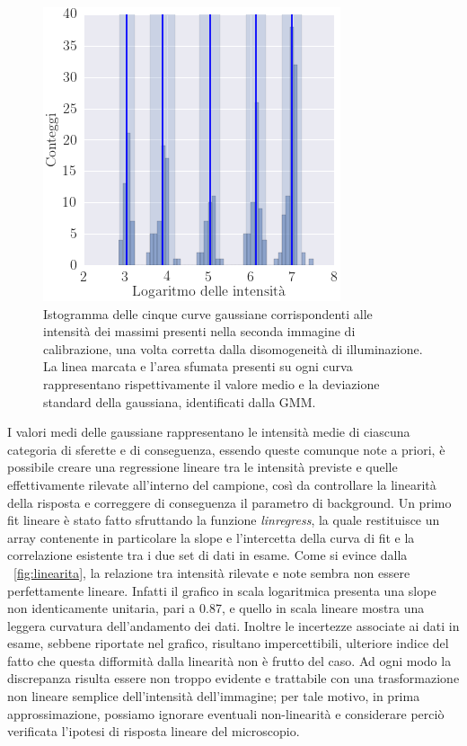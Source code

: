 \begin{figure}
 \centering
 \includegraphics[scale=.60]{img/CAP3istogauss.png}
 \caption{\small{Istogramma delle cinque curve gaussiane corrispondenti alle intensità dei massimi presenti nella seconda immagine di calibrazione, una volta corretta dalla disomogeneità di illuminazione. La linea marcata e l'area sfumata presenti su ogni curva rappresentano rispettivamente il valore medio e la deviazione standard della gaussiana, identificati dalla GMM.}}
 \label{fig:istogauss}
\end{figure}

I valori medi delle gaussiane rappresentano le intensità medie di ciascuna categoria di sferette e di conseguenza, essendo queste comunque note a priori, è possibile creare una regressione lineare tra le intensità previste e quelle effettivamente rilevate all'interno del campione, così da controllare la linearità della risposta e correggere di conseguenza il parametro di background. 
Un primo fit lineare è stato fatto sfruttando la funzione \textit{linregress}, la quale restituisce un array contenente in particolare la slope e l'intercetta della curva di fit e la correlazione esistente tra i due set di dati in esame.
Come si evince dalla \figurename~\ref{fig:linearita}, la relazione tra intensità rilevate e note sembra non essere perfettamente lineare. Infatti il grafico in scala logaritmica presenta una slope non identicamente unitaria, pari a 0.87, e quello in scala lineare mostra una leggera curvatura dell'andamento dei dati. 
Inoltre le incertezze associate ai dati in esame, sebbene riportate nel grafico, risultano impercettibili, ulteriore indice del fatto che questa  difformità dalla linearità non è frutto del caso.
Ad ogni modo la discrepanza risulta essere non troppo evidente e trattabile con una trasformazione non lineare semplice dell'intensità dell'immagine; per tale motivo, in prima approssimazione, possiamo ignorare eventuali non-linearità e considerare perciò verificata l'ipotesi di risposta lineare del microscopio. 

